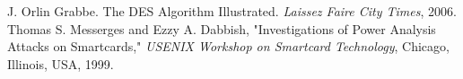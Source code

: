 \documentclass[letterpaper, 10 pt, conference]{ieeeconf}  %
\begin{document}






\begin{thebibliography}{99}

 J. Orlin Grabbe. The DES Algorithm Illustrated. \emph{Laissez Faire City Times}, 2006.
 Thomas S. Messerges and Ezzy A. Dabbish, "Investigations of Power Analysis Attacks on Smartcards," \emph{USENIX Workshop on Smartcard Technology}, Chicago, Illinois, USA, 1999. 

\end{thebibliography}
\end{document}

